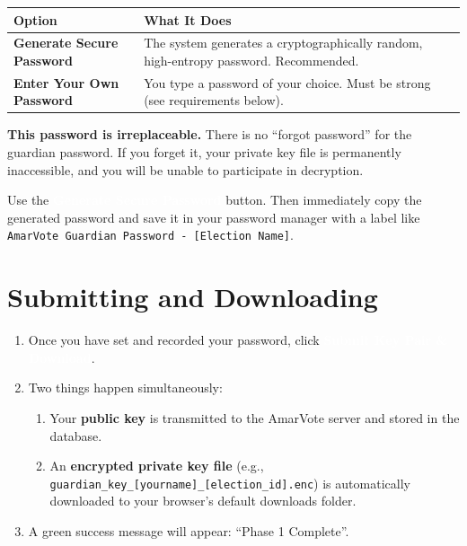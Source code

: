 \documentclass[12pt,a4paper]{book}
\newcommand{\uibutton}[1]{\colorbox{guardgreen}{\textcolor{white}{\small\textbf{#1}}}}
\begin{document}
\begin{center}
\begin{tabularx}{0.9\textwidth}{>{\bfseries}l X}
\toprule
\rowcolor{guardgreen}\color{white}Option & \color{white}What It Does \\
\midrule
\rowcolor{lightgray}Generate Secure Password & The system generates a cryptographically random, high-entropy password. Recommended. \\
Enter Your Own Password & You type a password of your choice. Must be strong (see requirements below). \\
\bottomrule
\end{tabularx}
\end{center}

\begin{tcolorbox}[dangerbox]
\textbf{This password is irreplaceable.} There is no ``forgot password'' for the guardian password. If you forget it, your private key file is permanently inaccessible, and you will be unable to participate in decryption.
\end{tcolorbox}

\begin{tcolorbox}[tipbox]
Use the \uibutton{Generate Secure Password} button. Then immediately copy the generated password and save it in your password manager with a label like \texttt{AmarVote Guardian Password - [Election Name]}.
\end{tcolorbox}

\section{Submitting and Downloading}

\begin{enumerate}
  \item Once you have set and recorded your password, click \uibutton{Submit Key Pair \& Download}.
  \item Two things happen simultaneously:
  \begin{enumerate}
    \item Your \textbf{public key} is transmitted to the AmarVote server and stored in the database.
    \item An \textbf{encrypted private key file} (e.g., \texttt{guardian\_key\_[yourname]\_[election\_id].enc}) is automatically downloaded to your browser's default downloads folder.
  \end{enumerate}
  \item A green success message will appear: ``Phase 1 Complete''.
\end{enumerate}
\end{document}
